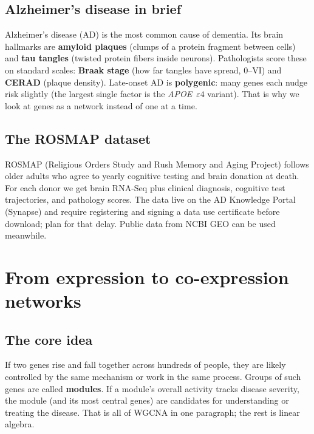 \documentclass[11pt]{article}
\begin{document}
\subsection{Alzheimer's disease in brief}

Alzheimer's disease (AD) is the most common cause of dementia. Its brain
hallmarks are \textbf{amyloid plaques} (clumps of a protein fragment between
cells) and \textbf{tau tangles} (twisted protein fibers inside neurons).
Pathologists score these on standard scales: \textbf{Braak stage} (how far
tangles have spread, 0--VI) and \textbf{CERAD} (plaque density). Late-onset AD
is \textbf{polygenic}: many genes each nudge risk slightly (the largest single
factor is the \textit{APOE}~$\varepsilon4$ variant). That is why we look at
genes as a network instead of one at a time.

\subsection{The ROSMAP dataset}

ROSMAP (Religious Orders Study and Rush Memory and Aging Project) follows
older adults who agree to yearly cognitive testing and brain donation at
death. For each donor we get brain RNA-Seq plus clinical diagnosis, cognitive
test trajectories, and pathology scores. The data live on the AD Knowledge
Portal (Synapse) and require registering and signing a data use certificate
before download; plan for that delay. Public data from NCBI GEO can be used
meanwhile.

\section{From expression to co-expression networks}

\subsection{The core idea}

If two genes rise and fall together across hundreds of people, they are
likely controlled by the same mechanism or work in the same process. Groups of
such genes are called \textbf{modules}. If a module's overall activity tracks
disease severity, the module (and its most central genes) are candidates for
understanding or treating the disease. That is all of WGCNA in one paragraph;
the rest is linear algebra.
\end{document}
